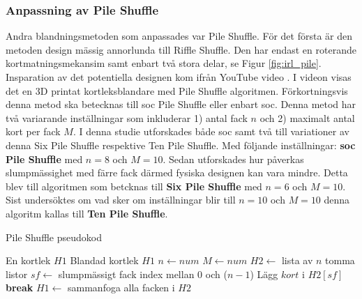 \documentclass[swedish,a4paper]{article}
\begin{document}


\subsubsection{Anpassning av Pile Shuffle}
Andra blandningsmetoden som anpassades var Pile Shuffle.
För det första är den metoden design mässig 
annorlunda till Riffle Shuffle. Den har endast en roterande
kortmatningsmekansim samt enbart två stora delar, se Figur
\ref{fig:irl_pile}. Insparation av det potentiella designen 
kom ifrån YouTube video 
\textcite{3DprintedLife2021}. I videon visas det en 3D printat kortleksblandare med Pile Shuffle algoritmen. Förkortningsvis denna  metod 
ska betecknas till \gls{soc} Pile Shuffle eller enbart 
\gls{soc}. Denna metod har två variarande inställningar som 
inkluderar 1) antal fack $n$ och 2) maximalt antal kort per
fack $M$. I denna studie utforskades både \gls{soc} samt 
två till variationer av denna Six Pile Shuffle respektive 
Ten Pile Shuffle. Med följande inställningar:
\textbf{\gls{soc} Pile Shuffle} med $n = 8$ och $M = 10$. Sedan utforskades hur påverkas slumpmässighet med färre fack
därmed fysiska designen kan vara mindre. Detta blev till 
algoritmen som betcknas till 
\textbf{Six Pile Shuffle} med $n = 6$ och $M = 10$. Sist undersöktes om vad sker om inställningar blir till $n = 10$ och $M = 10$ denna algoritm kallas till
\textbf{Ten Pile Shuffle}.

\begin{algorithm}
\caption{Pile Shuffle pseudokod}
\label{alg:pile}
\begin{algorithmic}[1]
\Require En kortlek $H1$
\Ensure Blandad kortlek $H1$ 
\State $n \gets num$ 
\State $M \gets num $ 
\State $H2 \gets$ lista av $n$ tomma listor %
    \Loop
        \State $sf \gets$ slumpmässigt fack index mellan $0$ och ($n-1$) 
            \State Lägg $kort$ i $H2[sf]$
            \State \textbf{break}
        \EndIf
    \EndLoop
\EndFor
\State $H1 \gets$ sammanfoga alla facken i $H2$ 
\end{algorithmic}
\end{algorithm}
\end{document}
